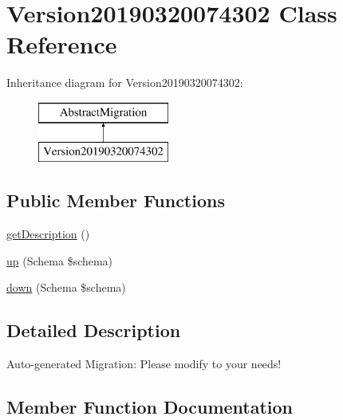 \hypertarget{class_doctrine_migrations_1_1_version20190320074302}{}\section{Version20190320074302 Class Reference}
\label{class_doctrine_migrations_1_1_version20190320074302}
Inheritance diagram for Version20190320074302\+:\begin{figure}[H]
\begin{center}
\leavevmode
\includegraphics[height=2.000000cm]{class_doctrine_migrations_1_1_version20190320074302}
\end{center}
\end{figure}
\subsection*{Public Member Functions}
\begin{DoxyCompactItemize}
\item 
\mbox{\hyperlink{class_doctrine_migrations_1_1_version20190320074302_a2e7bb35c71bf1824456ceb944cb7a845}{get\+Description}} ()
\item 
\mbox{\hyperlink{class_doctrine_migrations_1_1_version20190320074302_a23eb1c1428e8ea2ab2cf798fc06ec421}{up}} (Schema \$schema)
\item 
\mbox{\hyperlink{class_doctrine_migrations_1_1_version20190320074302_aa8eb70255a46429d4d6165c778c9e5b9}{down}} (Schema \$schema)
\end{DoxyCompactItemize}


\subsection{Detailed Description}
Auto-\/generated Migration\+: Please modify to your needs! 

\subsection{Member Function Documentation}
\mbox{\label{class_doctrine_migrations_1_1_version20190320074302_aa8eb70255a46429d4d6165c778c9e5b9}} 
